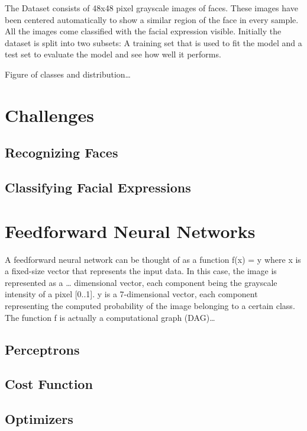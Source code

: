\documentclass[a4paper,english]{report}
\begin{document}
        The Dataset consists of 48x48 pixel grayscale images of faces. 
        These images have been centered automatically to show a similar 
        region of the face in every sample. All the images come classified
        with the facial expression visible.
        Initially the dataset is split into two subsets: A training set 
        that is used to fit the model and a test set to evaluate the model
        and see how well it performs.

        Figure of classes and distribution…
        
        \chapter{Challenges}
        \section{Recognizing Faces}
        \section{Classifying Facial Expressions}
        \chapter{Feedforward Neural Networks}
        A feedforward neural network can be thought of as a function f(x) = y
        where x is a fixed-size vector that represents the input data. In this
        case, the image is represented as a … dimensional vector, each component
        being the grayscale intensity of a pixel [0..1]. y is a 7-dimensional vector,
        each component representing the computed probability of the image belonging 
        to a certain class. The function f is actually a computational graph (DAG)…

        \section{Perceptrons}

        \section{Cost Function}

        \section{Optimizers}
\end{document}
